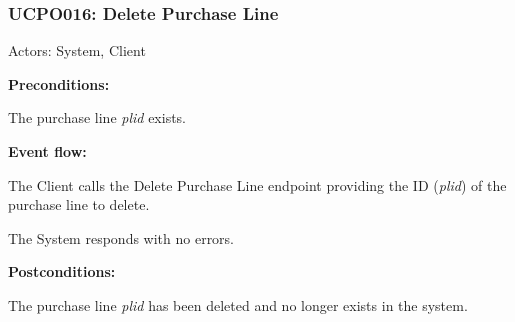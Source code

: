 \begin{ucbox}{\subsubsection{UCPO016: Delete Purchase Line}}
\label{UCPO016}

Actors: System, Client

\textbf{Preconditions:}

\ucitem The purchase line \textit{plid} exists.

\textbf{Event flow:}

\ucitem The Client calls the Delete Purchase Line endpoint providing the ID (\textit{plid}) of the purchase line to delete.

\ucitem The System responds with no errors.

\textbf{Postconditions:}

\ucitem The purchase line \textit{plid} has been deleted and no longer exists in the system.

\end{ucbox}
\newpage